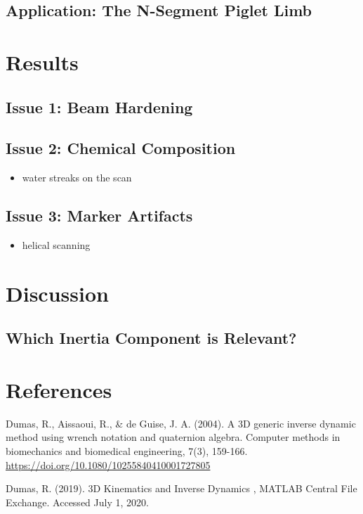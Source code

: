 \subsection{Application: The N-Segment Piglet Limb}
\label{sec:orge697170}

\section{Results}
\label{sec:orgb64af67}
\subsection{Issue 1: Beam Hardening}
\label{sec:org0dd2f2c}
\subsection{Issue 2: Chemical Composition}
\label{sec:org035ffb7}
\begin{itemize}
\item water streaks on the scan
\end{itemize}
\subsection{Issue 3: Marker Artifacts}
\label{sec:org21b2146}
\begin{itemize}
\item helical scanning
\end{itemize}

\section{Discussion}
\label{sec:org4ec6dc5}
\subsection{Which Inertia Component is Relevant?}
\label{sec:org69962d6}


\section{References}
\label{sec:orgc2d292c}


Dumas, R., Aissaoui, R., \& de Guise, J. A. (2004). A 3D generic inverse dynamic method using wrench notation and quaternion algebra. Computer methods in biomechanics and biomedical engineering, 7(3), 159-166. \url{https://doi.org/10.1080/10255840410001727805}

Dumas, R. (2019). 3D Kinematics and Inverse Dynamics , MATLAB Central File Exchange. Accessed July 1, 2020.

